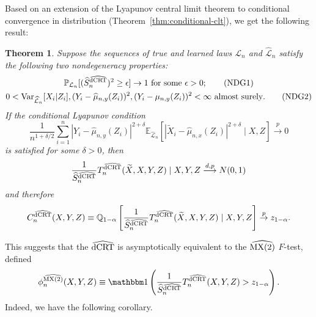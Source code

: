 \documentclass[aos]{imsart}
\theoremstyle{plain}
\newtheorem{theorem}{Theorem}
\theoremstyle{remark}
\newcommand{\E}{\mathbb E}								%
\newcommand{\V}{\mathrm{Var}}							%
\renewcommand{\P}{\mathbb{P}}							%
\newcommand{\Q}{\mathbb{Q}}								%
\newcommand{\indicator}{\mathbbm 1}						%
\newcommand{\convp}{\overset p \rightarrow}             %
\newcommand{\srx}{X}									%
\newcommand{\srz}{Z}									%
\newcommand{\srxk}{\widetilde X}						%
\newcommand{\sry}{Y}									%
\newcommand{\law}{\mathcal L}							%
\newcommand{\lawhat}{\widehat{\mathcal L}}				%
\newcommand{\dCRThat}{\widehat{\textnormal{dCRT}}}		%
\newcommand{\MXtwohat}{\widehat{\textnormal{MX(2)}}}	%
\newcommand{\convdp}{\overset {d,p} \longrightarrow}    %
\begin{document}
Based on an extension of the Lyapunov central limit theorem to conditional convergence in distribution (Theorem~\ref{thm:conditional-clt}), we get the following result:
\begin{theorem} \label{thm:normal-limit}
    Suppose the sequences of true and learned laws $\law_n$ and $\lawhat_n$ satisfy the following two nondegeneracy properties:
    \begin{gather}
        \P_{\law_n}[(\widehat S_{n}^{\dCRThat})^2 \geq \epsilon] \rightarrow 1 \ \text{for some } \epsilon > 0
        \label{eq:var-bounded-below}; \tag{NDG1} \\
        0 < \V_{\lawhat_n}[\srx_i|\srz_i], (\sry_i - \widehat \mu_{n, y}(\srz_i))^2, (\sry_i - \mu_{n, y}(\srz_i))^2 < \infty \ \text{almost surely}. \label{eq:variance-bounds} \tag{NDG2}
    \end{gather}
    If the conditional Lyapunov condition
    \begin{equation}
        \frac{1}{n^{1+\delta/2}} \sum_{i=1}^n |\sry_i-\widehat\mu_{n,y}(\srz_i)|^{2+\delta}\E_{\lawhat_n}\left[|\srxk_i-\widehat\mu_{n,x}(\srz_i)|^{2+\delta}\mid \srx,\srz\right] \convp 0
        \label{eq:lyapunov-condition} \tag{Lyap-1}
    \end{equation}
    is satisfied for some $\delta > 0$, then
    \begin{equation}
        \frac{1}{\widehat S_{n}^{\dCRThat}}T_n^{\dCRThat}(\srxk, \srx, \sry, \srz) \mid \srx, \sry, \srz \convdp N(0,1)
        \label{eq:conditional-convergence}
    \end{equation}
    and therefore
    \begin{equation}
        C^{\dCRThat}_n(\srx, \sry, \srz) \equiv \Q_{1-\alpha}\left[\frac{1}{\widehat S_{n}^{\dCRThat}}T_n^{\dCRThat}(\srxk, \srx, \sry, \srz) \mid \srx, \sry, \srz\right] \convp z_{1-\alpha}.
        \label{eq:critical-value-convergence}
    \end{equation}
\end{theorem}

This suggests that the $\dCRThat$ is asymptotically equivalent to the $\MXtwohat$ $F$-test, defined
\begin{equation}
    \phi_n^{\MXtwohat}(\srx,\sry,\srz) \equiv \indicator\left(\frac{1}{\widehat S_{n}^{\dCRThat}}T_n^{\dCRThat}(\srx, \sry, \srz) > z_{1-\alpha}\right).
    \label{eq:mx-2-f-test}
\end{equation}
Indeed, we have the following corollary.
\end{document}

